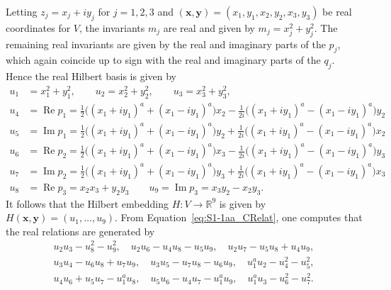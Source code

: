 \documentclass[twoside]{amsart}
\theoremstyle{definition}
\theoremstyle{remark}
\numberwithin{equation}{section}
\newcommand{\R}{\mathbb{R}}
\newcommand{\Real}{\operatorname{Re}}
\newcommand{\Imaginary}{\operatorname{Im}}
\begin{document}
Letting $z_j = x_j + i y_j$ for $j = 1,2,3$ and $(\mathbf{x},\mathbf{y}) = (x_1, y_1, x_2, y_2, x_3, y_3)$ be real coordinates for $V$,
the invariants $m_j$ are real and given by $m_j = x_j^2 + y_j^2$.
The remaining real invariants are given by the real and imaginary parts of the $p_j$, which again coincide up to sign with the real and imaginary parts of the $q_j$.
Hence the real Hilbert basis is given by
\begin{equation}
\label{eq:S1-1aa_RInvars}
\begin{split}
    u_1 &=      x_1^2 + y_1^2,
    \qquad
    u_2 =       x_2^2 + y_2^2,
    \qquad
    u_3 =       x_3^2 + y_3^2,
    \\
    u_4 &=      \Real p_1
        =       \frac{1}{2}\big( (x_1 + i y_1)^a + (x_1 - i y_1)^a \big)x_2 - \frac{1}{2i}\big( (x_1 + i y_1)^a - (x_1 - i y_1)^a \big)y_2
    \\
    u_5 &=      \Imaginary p_1
        =       \frac{1}{2}\big( (x_1 + i y_1)^a + (x_1 - i y_1)^a \big)y_2 + \frac{1}{2i}\big( (x_1 + i y_1)^a - (x_1 - i y_1)^a \big)x_2
    \\
    u_6 &=      \Real p_2
        =       \frac{1}{2}\big( (x_1 + i y_1)^a + (x_1 - i y_1)^a \big)x_3 - \frac{1}{2i}\big( (x_1 + i y_1)^a - (x_1 - i y_1)^a \big)y_3
    \\
    u_7 &=      \Imaginary p_2
        =       \frac{1}{2}\big( (x_1 + i y_1)^a + (x_1 - i y_1)^a \big)y_3 + \frac{1}{2i}\big( (x_1 + i y_1)^a - (x_1 - i y_1)^a \big)x_3
    \\
    u_8 &=      \Real p_3
        =       x_2 x_3 + y_2 y_3
    \qquad
    u_9 =      \Imaginary p_3
        =       x_3 y_2 - x_2 y_3.
\end{split}
\end{equation}
It follows that the Hilbert embedding $H\colon V\to\R^9$ is given by
$H(\mathbf{x}, \mathbf{y}) = (u_1, \ldots, u_9)$. From Equation~\eqref{eq:S1-1aa_CRelat}, one computes that the real relations are generated by
\begin{equation}
\label{eq:S1-1aa_RRelat}
\begin{split}
    u_2 u_3 - u_8^2 - u_9^2, \quad
    u_2 u_6 - u_4 u_8 - u_5 u_9, \quad
    u_2 u_7 - u_5 u_8 + u_4 u_9,
    \\
    u_3 u_4 - u_6 u_8 + u_7 u_9, \quad
    u_3 u_5 - u_7 u_8 - u_6 u_9, \quad
    u_1^a u_2 - u_4^2 - u_5^2,
    \\
    u_4 u_6 + u_5 u_7 - u_1^a u_8, \quad
    u_5 u_6 - u_4 u_7 - u_1^a u_9, \quad
    u_1^a u_3 - u_6^2 - u_7^2.
\end{split}
\end{equation}
\end{document}
